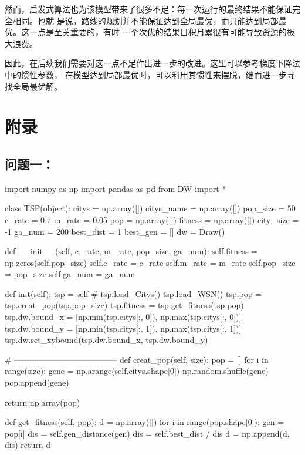\documentclass{ctexart}
\begin{document}
    然而，启发式算法也为该模型带来了很多不足：每一次运行的最终结果不能保证完全相同。也就
    是说，路线的规划并不能保证达到全局最优，而只能达到局部最优。这一点是至关重要的，有时
    一个次优的结果日积月累很有可能导致资源的极大浪费。

    因此，在后续我们需要对这一点不足作出进一步的改进。这里可以参考梯度下降法中的惯性参数，
    在模型达到局部最优时，可以利用其惯性来摆脱，继而进一步寻找全局最优解。

    \section*{附录}
    \subsection*{问题一：}
    \begin{python}
import numpy as np
import pandas as pd
from DW import *

class TSP(object):
    citys = np.array([])
    citys_name = np.array([])
    pop_size = 50
    c_rate = 0.7
    m_rate = 0.05
    pop = np.array([])
    fitness = np.array([])
    city_size = -1
    ga_num = 200
    best_dist = 1
    best_gen = []
    dw = Draw()

    def __init__(self, c_rate, m_rate, pop_size, ga_num):
        self.fitness = np.zeros(self.pop_size)
        self.c_rate = c_rate
        self.m_rate = m_rate
        self.pop_size = pop_size
        self.ga_num = ga_num

    def init(self):
        tsp = self
        # tsp.load_Citys()
        tsp.load_WSN()
        tsp.pop = tsp.creat_pop(tsp.pop_size)
        tsp.fitness = tsp.get_fitness(tsp.pop)
        tsp.dw.bound_x = [np.min(tsp.citys[:, 0]), np.max(tsp.citys[:, 0])]
        tsp.dw.bound_y = [np.min(tsp.citys[:, 1]), np.max(tsp.citys[:, 1])]
        tsp.dw.set_xybound(tsp.dw.bound_x, tsp.dw.bound_y)

    # --------------------------------------
    def creat_pop(self, size):
        pop = []
        for i in range(size):
            gene = np.arange(self.citys.shape[0])
            np.random.shuffle(gene)
            pop.append(gene)

        return np.array(pop)

    def get_fitness(self, pop):
        d = np.array([])
        for i in range(pop.shape[0]):
            gen = pop[i]  
            dis = self.gen_distance(gen)
            dis = self.best_dist / dis
            d = np.append(d, dis)
        return d


\end{python}
\end{document}

